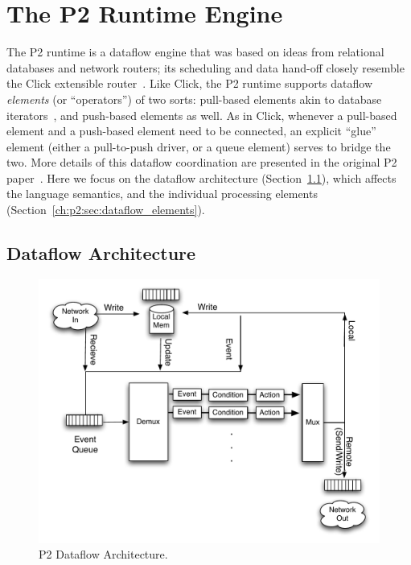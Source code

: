 \section{The P2 Runtime Engine}
\label{ch:p2:sec:p2}

The P2 runtime is a dataflow engine that was based on ideas from relational
databases and network routers; its scheduling and data hand-off closely
resemble the Click extensible router~\cite{click-tocs}.  Like Click, the P2
runtime supports dataflow {\em elements} (or ``operators'') of two sorts:
pull-based elements akin to database iterators~\cite{graefe-survey}, and
push-based elements as well.  As in Click, whenever a pull-based element and a
push-based element need to be connected, an explicit ``glue'' element (either a
pull-to-push driver, or a queue element) serves to bridge the two.  More
details of this dataflow coordination are presented in the original P2
paper~\cite{p2:sosp}.  Here we focus on the dataflow architecture
(Section~\ref{ch:p2:sec:dataflow}), which affects the language semantics, and
the individual processing elements (Section~\ref{ch:p2:sec:dataflow_elements}).

\subsection{Dataflow Architecture}
\label{ch:p2:sec:dataflow}

\begin{figure} 
\ssp
\begin{center}
\includegraphics[scale=0.6]{figures/p2-arch}
\caption{\label{ch:p2:fig:dataflow}P2 Dataflow Architecture.}
\end{center} 
\end{figure}


